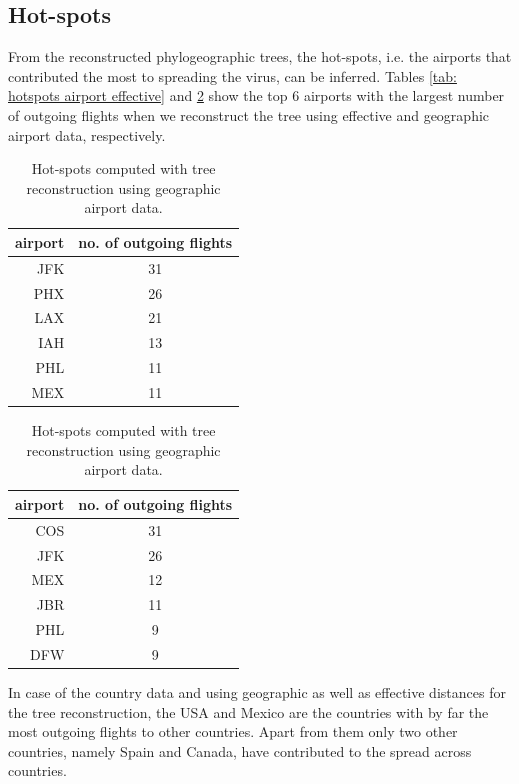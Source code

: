 \documentclass{article}
\begin{document}
\subsection{Hot-spots}
From the reconstructed phylogeographic trees, the hot-spots, i.e. the airports that contributed the most to spreading the virus, can be inferred. Tables \ref{tab: hotspots airport effective} and \ref{tab: hotspots airport geographic} show the top 6 airports with the largest number of outgoing flights when we reconstruct the tree using effective and geographic airport data, respectively.

\begin{table}[h!]
\centering
\parbox{.45\linewidth}{
\centering
\begin{tabular}{r|c}
airport & no. of outgoing flights \\
\hline
JFK      & 31                      \\
PHX      & 26                      \\
LAX      & 21                      \\
IAH      & 13                      \\
PHL      & 11                      \\
MEX      & 11                                     
\end{tabular}
\caption{Hot-spots computed with tree reconstruction using effective airport data.}
\label{tab: hotspots airport effective}
}
\qquad
\parbox{.45\linewidth}{
\centering
\begin{tabular}{r|c}
airport & no. of outgoing flights \\
\hline
COS      & 31                      \\
JFK      & 26                      \\
MEX      & 12                      \\
JBR      & 11                      \\
PHL      & 9                       \\
DFW      & 9                                
\end{tabular}
\caption{Hot-spots computed with tree reconstruction using geographic airport data.}
\label{tab: hotspots airport geographic}
}
\end{table}

In case of the country data and using geographic as well as effective distances for the tree reconstruction, the USA and Mexico are the countries with by far the most outgoing flights to other countries. Apart from them only two other countries, namely Spain and Canada, have contributed to the spread across countries.
\end{document}
